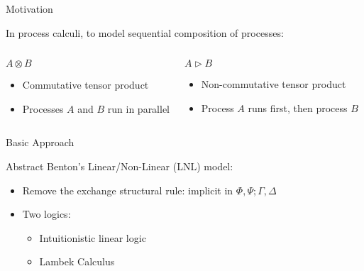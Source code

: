 \documentclass{beamer}
\begin{document}
\begin{frame}{Motivation}

In process calculi, to model sequential composition of processes:

\begin{columns}
  \begin{block}{$A\otimes B$}
  \begin{itemize}
  \item Commutative tensor product
  \item Processes $A$ and $B$ run in parallel
  \end{itemize}
  \end{block}
  \begin{block}{$A\triangleright B$}
  \begin{itemize}
  \item Non-commutative tensor product
  \item Process $A$ runs first, then process $B$
  \end{itemize}
  \end{block}
\end{columns}

\end{frame}

\begin{frame}{Basic Approach}

Abstract Benton's Linear/Non-Linear (LNL) model:
\begin{itemize}
\item Remove the exchange structural rule: implicit in
      $\Phi,\Psi;\Gamma,\Delta$
\item Two logics:
      \begin{itemize}
      \item Intuitionistic linear logic
      \item Lambek Calculus
      \end{itemize}
\end{itemize}

\end{frame}
\end{document}
